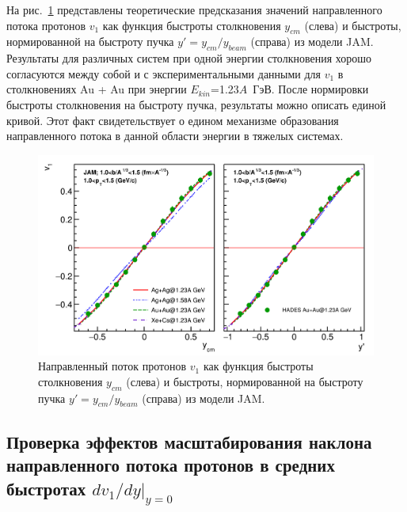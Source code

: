 На рис.~\ref{fig:hades_model_ycm_scaling} представлены теоретические предсказания значений направленного потока протонов $v_1$ как функция быстроты столкновения $y_{cm}$ (слева) и быстроты, нормированной на быстроту пучка $y'=y_{cm}/y_{beam}$ (справа) из модели JAM.
Результаты для различных систем при одной энергии столкновения хорошо согласуются между собой и с экспериментальными данными для $v_1$ в столкновениях Au + Au при энергии $E_{kin}$=1.23$A$~ГэВ.
После нормировки быстроты столкновения на быстроту пучка, результаты можно описать единой кривой.
Этот факт свидетельствует о едином механизме образования направленного потока в данной области энергии в тяжелых системах.
%
\begin{figure}[ht]
\begin{center}
\includegraphics[width=0.95\linewidth]{images/v1_hades_model_ycm_scaling.png}
\caption{Направленный поток протонов $v_1$ как функция быстроты столкновения $y_{cm}$ (слева) и быстроты, нормированной на быстроту пучка $y'=y_{cm}/y_{beam}$ (справа) из модели JAM.}
\label{fig:hades_model_ycm_scaling}
\end{center}
\end{figure}

\subsection{Проверка эффектов масштабирования наклона направленного потока протонов в средних быстротах $dv_1/dy|_{y=0}$}

